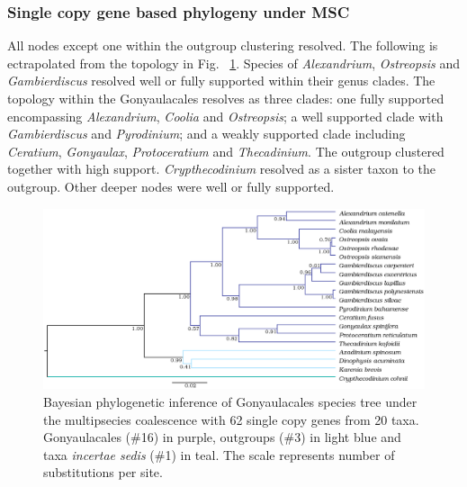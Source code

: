 \documentclass[12pt]{article}
\begin{document}
\subsubsection*{Single copy gene based phylogeny under MSC}
\FloatBarrier 
All nodes except one within the outgroup clustering resolved.
The following is ectrapolated from the topology in Fig. ~\ref{fig:SCmscBI}. 
Species of \emph{Alexandrium}, \emph{Ostreopsis} and \emph{Gambierdiscus} resolved well or fully supported within their genus clades. 
The topology within the Gonyaulacales resolves as three clades: 
one fully supported encompassing \emph{Alexandrium}, \emph{Coolia} and \emph{Ostreopsis};
a well supported clade with \emph{Gambierdiscus} and \emph{Pyrodinium}; 
and a weakly supported clade including \emph{Ceratium}, \emph{Gonyaulax}, \emph{Protoceratium} and \emph{Thecadinium}. 
The outgroup clustered together with high support. 
\emph{Crypthecodinium} resolved as a sister taxon to the outgroup. 
Other deeper nodes were well or fully supported.

\begin{figure} 
\includegraphics[scale=.25]{figures/Aug2_20-taxa-combined-fig_MCC_trees.png} 
\caption{Bayesian phylogenetic inference of Gonyaulacales species tree under the multipsecies coalescence with 62 single copy genes from 20 taxa. Gonyaulacales (\#16) in purple, outgroups (\#3) in light blue and taxa \textit{incertae sedis} (\#1) in teal. The scale represents number of substitutions per site.} 
\label{fig:SCmscBI}
\end{figure} 
\FloatBarrier

\newpage
\end{document}
